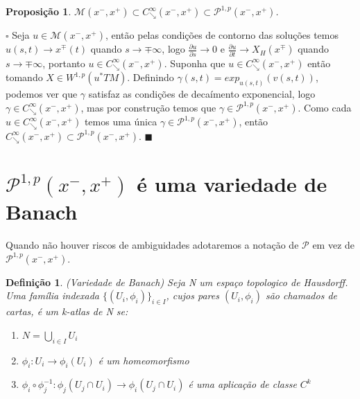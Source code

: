 \documentclass[12pt]{book}
\newtheorem{definicao}[teorema]{Definição}
\newtheorem{proposicao}[teorema]{Proposição}
\newenvironment{prova}[1]{$\square$ #1}{\hfill$\blacksquare$}
\newcommand{\aplicacaoexponencial}[2]{exp_{#1}(#2)}
\newcommand{\caminhosdecaimentoexponencial}[2]{C^{\infty}_{\searrow}(#1, #2)}
\newcommand{\caminhosdecaimentoexponencialpadrao}{\caminhosdecaimentoexponencial{x^{-}}{x^{+}}}
\newcommand{\caminhosexponenciaisconectantesabrev}{\mathcal{P}}
\newcommand{\caminhosexponenciaisconectantes}[2]{\mathcal{P}^{1,p}(#1, #2)}
\newcommand{\caminhosexponenciaisconectantespadrao}{\caminhosexponenciaisconectantes{x^{-}}{x^{+}}}
\newcommand{\derivadaparcial}[2]{\frac{\partial #1}{\partial #2}}
\newcommand{\espacosobolev}[1]{W^{1,p}(#1)}
\newcommand{\orbitasconectantespadrao}{\mathcal{M}(x^{-}, x^{+})}
\newcommand{\pullbackfibradotangente}[2]{#1^{*}T#2}
\newcommand{\pullbackfibradotangenteM}[1]{\pullbackfibradotangente{#1}{M}}
\begin{document}
	\begin{proposicao}
		$\orbitasconectantespadrao \subset \caminhosdecaimentoexponencialpadrao \subset  \caminhosexponenciaisconectantespadrao$.
	\end{proposicao}
	\begin{prova}
		Seja $u \in \orbitasconectantespadrao$, então pelas condições de contorno das soluções temos $u(s,t)  \to x^{\mp}(t)$ quando $s\to \mp \infty$, logo $\derivadaparcial{u}{s} \to 0$ e $\derivadaparcial{u}{t} \to X_{H}(x^{\mp})$ quando $s\to \mp \infty$, portanto $u \in \caminhosdecaimentoexponencialpadrao$. Suponha que $u \in \caminhosdecaimentoexponencialpadrao$ então tomando $X \in \espacosobolev{\pullbackfibradotangenteM{u}}$. Definindo $\gamma(s, t) =\aplicacaoexponencial{u(s, t)}{v(s, t)}$, podemos ver que $\gamma$ satisfaz as condições de decaímento exponencial, logo $\gamma \in \caminhosdecaimentoexponencialpadrao$, mas por construção temos que $\gamma \in \caminhosexponenciaisconectantespadrao$. Como cada $u \in \caminhosdecaimentoexponencialpadrao$ temos uma única $\gamma \in \caminhosexponenciaisconectantespadrao$, então $\caminhosdecaimentoexponencialpadrao \subset \caminhosexponenciaisconectantespadrao$. 
	\end{prova}
	
	\section{$\caminhosexponenciaisconectantespadrao$ é uma variedade de Banach}

	Quando não houver riscos de ambiguidades adotaremos a notação de $\caminhosexponenciaisconectantesabrev$ em vez de $\caminhosexponenciaisconectantespadrao$.

	\begin{definicao}
		(Variedade de Banach) Seja N um espaço topologico de Hausdorff. Uma família indexada $\{(U_{i}, \phi_{i})\}_{i \in I}$, cujos pares $(U_{i}, \phi_{i})$ são chamados de cartas, é um k-atlas de N se:
		\begin{enumerate}
			\item $N=\bigcup_{i\in I} U_{i}$
			\item $\phi_{i}:U_{i} \to \phi_{i}(U_{i})$ é um homeomorfismo
			\item $\phi_{i}\circ \phi_{j}^{-1}: \phi_{j}(U_{j}\cap U_{i}) \to \phi_{i}(U_{j}\cap U_{i}) $ é uma aplicação de classe $C^{k}$
		\end{enumerate}
	\end{definicao}
	
\end{document}
